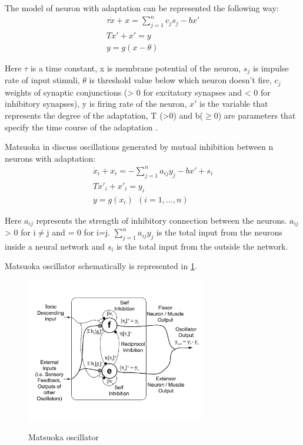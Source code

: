 \documentclass[11pt,a4paper]{report}
\begin{document}
				The model of neuron with adaptation can be represented the following way:
				\begin{equation}\label{eq:Mats1}
					\begin{split}
						\tau \dot{x} + x = \sum^n_{j = 1} c_j s_j - b x \prime\\
						T \dot{x} \prime  + x \prime = y\\
						y = g(x - \theta)
					\end{split}
				\end{equation}
				
				Here $\tau$ is a time constant, x is membrane potential of the neuron, $s_j$ is impulse rate of input stimuli, $\theta$ is threshold value below which neuron doesn't fire, $c_j$ weights of synaptic conjunctions (> 0 for excitatory synapses and < 0 for inhibitory synapses), y is firing rate of the neuron, $x \prime$ is the variable that represents the degree of the adaptation, T (>0) and b($\geq 0$) are parameters that specify the time course of the adaptation \cite{matsuoka1985sustained}.
				
				Matsuoka in \cite{matsuoka1985sustained} discuss oscillations generated by mutual inhibition between n neurons with adaptation:
				\begin{equation}\label{eq:Mats2}
					\begin{split}
						\dot{x}_i + x_i = - \sum^n_{j = 1} a_{ij} y_j - b x \prime + s_i\\
						T \dot{x} \prime _i  + x \prime _i= y_i\\
						y = g(x_i)\ \ (i = 1,...,n) 
					\end{split}
				\end{equation}
				
				Here $a_{ij}$ represents the strength of inhibitory connection between the neurons. $a_{ij}$ > 0 for i$\neq$j and = 0 for i=j. $\sum^n_{j = 1} a_{ij} y_j $ is the total input from the neurons inside a neural network and $s_{i}$ is the total input from the outside the network. 
				
				Matsuoka oscillator schematically is represented in \ref{fig:4}.
				\begin{figure}[h!]
					\vspace{-0.2cm}
					\centering
					{\includegraphics[width=0.7\textwidth]{4}}
					\caption{Matsuoka oscillator}
					\label{fig:4}
					\vspace{-0.1cm}
				\end{figure}
				
\end{document}
